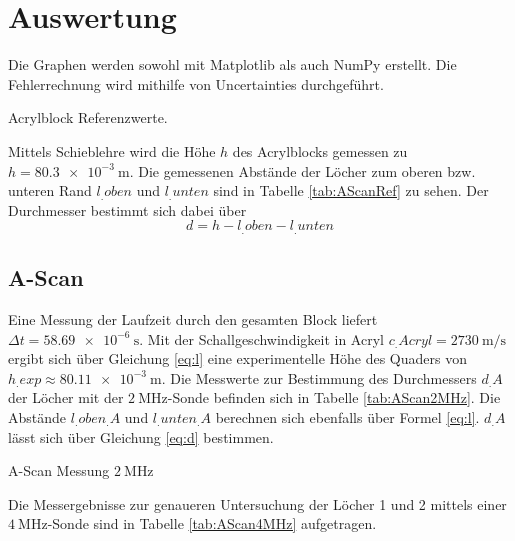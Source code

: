 \section{Auswertung}
\label{sec:Auswertung}

Die Graphen werden sowohl mit Matplotlib \cite{matplotlib} als auch NumPy \cite{numpy} erstellt. Die Fehlerrechnung wird mithilfe von Uncertainties \cite{uncertainties} durchgeführt.

\begin{table}
	\centering
	\caption{Acrylblock Referenzwerte.}
	
	\label{tab:AScanRef}
\end{table}

\noindent Mittels Schieblehre wird die Höhe $h$ des Acrylblocks gemessen zu $h=\SI{80,3e-3}{\metre}$. Die gemessenen Abstände der Löcher zum oberen bzw. unteren Rand  $l_.{oben}$ und $l_.{unten}$ sind in Tabelle \ref{tab:AScanRef} zu sehen.
Der Durchmesser bestimmt sich dabei über
\begin{equation}
d = h-l_.{oben}-l_.{unten}\label{eq:d}
\end{equation}

\subsection{A-Scan}
Eine Messung der Laufzeit durch den gesamten Block liefert $\Delta t = \SI{58,69e-6}{\second}$. Mit der Schallgeschwindigkeit in Acryl $c_.{Acryl}=\SI{2730}{\metre\per\second}$ ergibt sich über Gleichung \eqref{eq:l} eine experimentelle Höhe des Quaders von $h_.{exp}\approx\SI{80,11e-3}{\metre}$.\newline
Die Messwerte zur Bestimmung des Durchmessers $d_.A$ der Löcher mit der $\SI{2}{\mega\hertz}$-Sonde befinden sich in Tabelle \ref{tab:AScan2MHz}. Die Abstände $l_.{oben_.A}$ und $l_.{unten_.A}$ berechnen sich ebenfalls über Formel \eqref{eq:l}.
$d_.A$ lässt sich über Gleichung \eqref{eq:d} bestimmen. \newline

\begin{table}
	\centering
	\caption{A-Scan Messung $\SI{2}{\mega\hertz}$}
	
	\label{tab:AScan2MHz}
\end{table}

\noindent Die Messergebnisse zur genaueren Untersuchung der Löcher 1 und 2 mittels einer $\SI{4}{\mega\hertz}$-Sonde sind in Tabelle \ref{tab:AScan4MHz} aufgetragen.


